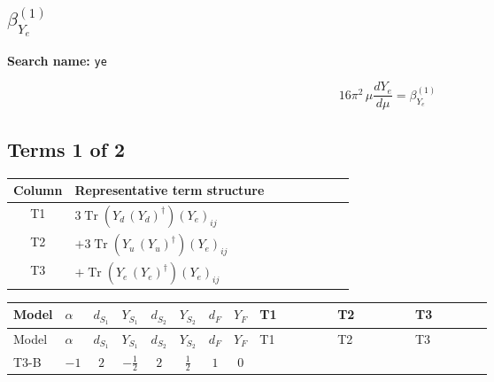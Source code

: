 \documentclass[8pt]{article}
\begin{document}
\begin{landscape}
\section*{$\beta_{Y_e}^{(1)}$}
\noindent\textbf{Search name: }\texttt{ye}\par\smallskip
\[16\pi^2\,\mu\frac{d Y_e}{d\mu}=\beta_{Y_e}^{(1)}\]
\subsection*{Terms 1 of 2}
\begin{center}
\begin{tabular}{@{}c >{\raggedright\arraybackslash}p{0.82\linewidth}@{}}
\toprule
Column & Representative term structure \\
\midrule
T1 & \(\displaystyle 3 \operatorname{Tr}\!\left({Y_d}\,\left({Y_d}\right)^{\dagger}\right) \left({Y_e}\right)_{ij}\) \\
\midrule
T2 & \(\displaystyle +3 \operatorname{Tr}\!\left({Y_u}\,\left({Y_u}\right)^{\dagger}\right) \left({Y_e}\right)_{ij}\) \\
\midrule
T3 & \(\displaystyle +\operatorname{Tr}\!\left({Y_e}\,\left({Y_e}\right)^{\dagger}\right) \left({Y_e}\right)_{ij}\) \\
\midrule
\bottomrule
\end{tabular}
\end{center}
\smallskip
\tiny
\begin{longtable}{@{}llcccccc >{\raggedright\arraybackslash}p{0.21\linewidth} >{\raggedright\arraybackslash}p{0.21\linewidth} >{\raggedright\arraybackslash}p{0.21\linewidth}@{}}
\toprule
Model & $\alpha$ & $d_{S_1}$ & $Y_{S_1}$ & $d_{S_2}$ & $Y_{S_2}$ & $d_F$ & $Y_F$ & T1 & T2 & T3 \\
\midrule
\endfirsthead
\toprule
Model & $\alpha$ & $d_{S_1}$ & $Y_{S_1}$ & $d_{S_2}$ & $Y_{S_2}$ & $d_F$ & $Y_F$ & T1 & T2 & T3 \\
\midrule
\endhead
T3-B & $-1$ & $2$ & $-\frac{1}{2}$ & $2$ & $\frac{1}{2}$ & $1$ & $0$ & \scriptsize\adjustbox{max width=\linewidth}{$\begin{gathered} 3 \operatorname{Tr}\!\left({Y_d}\,\left({Y_d}\right)^{\dagger}\right) \left({Y_e}\right)_{ij}\end{gathered}$} & \scriptsize\adjustbox{max width=\linewidth}{$\begin{gathered} +3 \operatorname{Tr}\!\left({Y_u}\,\left({Y_u}\right)^{\dagger}\right) \left({Y_e}\right)_{ij}\end{gathered}$} & \scriptsize\adjustbox{max width=\linewidth}{$\begin{gathered} +\operatorname{Tr}\!\left({Y_e}\,\left({Y_e}\right)^{\dagger}\right) \left({Y_e}\right)_{ij}\end{gathered}$} \\

\end{longtable}
\end{landscape}
\end{document}
